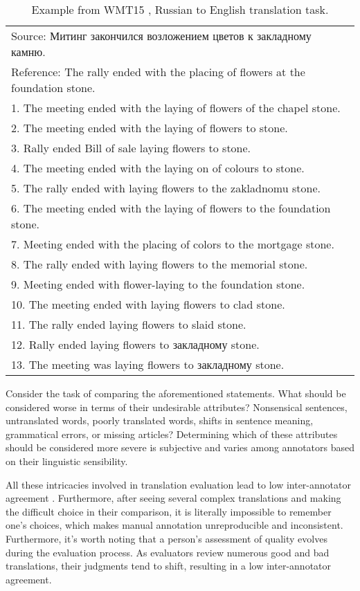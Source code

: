 \begin{table}[htb]
    \centering
    \begin{tabular}{l}
Source: Митинг закончился возложением цветов к закладному камню.\\
Reference: The rally ended with the placing of flowers at the foundation stone. \\
\hline
1. The meeting ended with the laying of flowers of the chapel stone. \\
2. The meeting ended with the laying of flowers to stone. \\
3. Rally ended Bill of sale laying flowers to stone. \\
4. The meeting ended with the laying on of colours to stone. \\
5. The rally ended with laying flowers to the zakladnomu stone. \\
6. The meeting ended with the laying of flowers to the foundation stone. \\
7. Meeting ended with the placing of colors to the mortgage stone. \\
8. The rally ended with laying flowers to the memorial stone.\\
9. Meeting ended with flower-laying to the foundation stone. \\
10. The meeting ended with laying flowers to clad stone.\\
11. The rally ended laying flowers to slaid stone.\\
12. Rally ended laying flowers to закладному stone.\\
13. The meeting was laying flowers to закладному stone.\\
\end{tabular}
     \caption{Example from WMT15 \citep{wmt15}, Russian to English translation task.}
    \label{table:wmt15:example}
\end{table}

Consider the task of comparing the aforementioned statements. What should be considered worse in terms of their undesirable attributes? Nonsensical sentences, untranslated words, poorly translated words, shifts in sentence meaning, grammatical errors, or missing articles? Determining which of these attributes should be considered more severe is subjective and varies among annotators based on their linguistic sensibility.

All these intricacies involved in translation evaluation lead to low inter-annotator agreement \cite{wmt13}.  Furthermore, after seeing several complex translations and making the difficult choice in their comparison, it is literally impossible to remember one's choices, which makes manual annotation unreproducible and inconsistent.
Furthermore, it's worth noting that a person's assessment of quality evolves during the evaluation process. As evaluators review numerous good and bad translations, their judgments tend to shift, resulting in a low inter-annotator agreement.  

